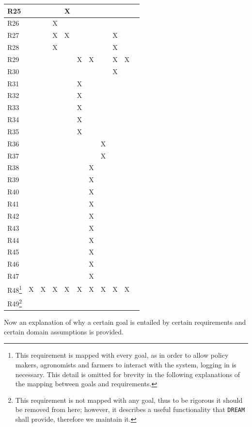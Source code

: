 \documentclass{article}
\begin{document}
\begin{longtable}[c]{|m{0.15cm}|m{0.15cm}|m{0.15cm}|m{0.15cm}|m{0.15cm}|m{0.15cm}|m{0.15cm}|m{0.15cm}|m{0.15cm}|m{0.15cm}|m{0.15cm}|}
 \hline
 R25 &   &   &   & X  &   &   &   &   &     \\
 \hline
 R26 &   &   & X  &   &  &   &   &   &      \\
 \hline
 R27 &   &   & X  & X  &  &   &   & X  &      \\
 \hline
 R28 &   &   & X  &   &   &  &   &  X &      \\
 \hline
 R29 &   &   &   &   & X  & X &   & X  & X  \\
 \hline
 R30 &   &   &   &   &   &  &   & X  &      \\
 \hline
 R31 &   &   &   &   & X  &  &   &   &      \\
 \hline
 R32 &   &   &   &   & X  &  &   &   &      \\
 \hline
 R33 &   &   &   &   & X  &  &   &   &      \\
 \hline
 R34 &   &   &   &   & X  &   &   &  &      \\
 \hline
 R35 &   &   &   &   & X  &   &   &  &      \\
 \hline
 R36 &   &   &   &   &   &   & X  &  &      \\
 \hline
 R37 &   &   &   &   &   &   & X  &  &      \\
 \hline
 R38 &   &   &   &   &   & X  &  &   &     \\
 \hline
 R39 &   &   &   &   &   & X  &  &   &     \\
 \hline
 R40 &   &   &   &   &   & X  &  &   &     \\
 \hline
 R41 &   &   &   &   &   & X  &  &   &      \\
 \hline
 R42 &   &   &   &   &   & X  &  &   &      \\
 \hline
 R43 &   &   &   &   &   & X  &  &   &      \\
 \hline
 R44 &   &   &   &   &   & X  &  &   &      \\
 \hline
 R45 &   &   &   &   &   &  X &  &   &      \\
 \hline
 R46 &   &   &   &   &   &  X &  &   &      \\
 \hline
 R47 &   &   &   &   &   & X  &  &   &      \\
 \hline
 R48\footnote{This requirement is mapped with every goal, as in order to allow policy makers, agronomists and farmers to interact with the system, logging in is necessary. This detail is omitted for brevity in the following explanations of the mapping between goals and requirements.} & X  & X  & X  & X  & X  & X  &X  &  X &   X   \\
 \hline
 R49\footnote{This requirement is not mapped with any goal, thus to be rigorous it should be removed from here; however, it describes a useful functionality that \verb|DREAM| shall provide, therefore we maintain it.} &    &    &    &    &    &    &   &    &     \\
 \hline
\end{longtable}
Now an explanation of why a certain goal is entailed by certain requirements and certain domain assumptions is provided.
\end{document}
